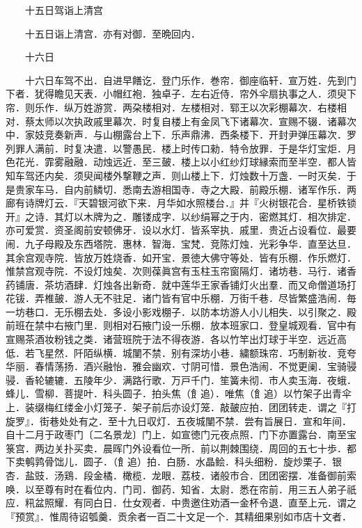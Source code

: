 　　十五日驾诣上清宫

　　十五日诣上清宫．亦有对御．至晩回内．

　　十六日

　　十六日车驾不出．自进早饍讫．登门乐作．巻帘．御座临轩．宣万姓．先到门下者．犹得瞻见天表．小帽红袍．独卓子．左右近侍．帘外伞扇执事之人．须臾下帘．则乐作．纵万姓游赏．两朶楼相对．左楼相对．郓王以次彩棚幕次．右楼相对．蔡太师以次执政戚里幕次．时复自楼上有金凤飞下诸幕次．宣赐不辍．诸幕次中．家妓竞奏新声．与山棚露台上下．乐声鼎沸．西条楼下．开封尹弹压幕次．罗列罪人满前．时复决遣．以警愚民．楼上时传口勑．特令放罪．于是华灯宝炬．月色花光．霏雾融融．动烛远近．至三皷．楼上以小红纱灯球縁索而至半空．都人皆知车驾还内矣．须臾闻楼外撃鞭之声．则山楼上下．灯烛数十万盏．一时灭矣．于是贵家车马．自内前鳞切．悉南去游相国寺．寺之大殿．前殿乐棚．诸军作乐．两廊有诗牌灯云．『天碧银河欲下来．月华如水照楼台．』并『火树银花合．星桥铁锁开』之诗．其灯以木牌为之．雕镂成字．以纱绢幂之于内．密燃其灯．相次排定．亦可爱赏．资圣阁前安顿佛牙．设以水灯．皆系宰执．戚里．贵近占设看位．最要闹．九子母殿及东西塔院．惠林．智海．宝梵．竞陈灯烛．光彩争华．直至达旦．其余宫观寺院．皆放万姓烧香．如开宝．景徳大佛守等处．皆有乐棚．作乐燃灯．惟禁宫观寺院．不设灯烛矣．次则葆眞宫有玉柱玉帘窗隔灯．诸坊巷．马行．诸香药铺唐．茶坊酒肆．灯烛各出新奇．就中莲华王家香铺灯火出羣．而又命僧道场打花钹．弄椎皷．游人无不驻足．诸门皆有官中乐棚．万街千巷．尽皆繁盛浩闹．毎一坊巷口．无乐棚去处．多设小影戏棚子．以防本坊游人小儿相失．以引聚之．殿前班在禁中右掖门里．则相对石掖门设一乐棚．放本班家口．登皇城观看．官中有宣赐茶酒妆粉钱之类．诸营班院于法不得夜游．各以竹竿出灯球于半空．远近高低．若飞星然．阡陌纵横．城闉不禁．别有深坊小巷．繍额珠帘．巧制新妆．竞夸华丽．春情荡扬．酒兴融怡．雅会幽欢．寸阴可惜．景色浩闹．不觉更阑．宝骑骎骎．香轮辘辘．五陵年少．满路行歌．万戸千门．笙簧未彻．市人卖玉海．夜蛾．蜂儿．雪柳．菩提叶．科头圆子．拍头焦（飠追）．唯焦（飠追）以竹架子出青伞上．装缀梅红缕金小灯笼子．架子前后亦设灯笼．敲皷应拍．团团转走．谓之『打旋罗』．街巷处处有之．至十九日収灯．五夜城闉不禁．尝有旨展日．宣和年间．自十二月于政枣门〔二名景龙〕门上．如宣徳门元夜点照．门下亦置露台．南至宝箓宫．两边关扑买卖．晨晖门外设看位一所．前以荆棘围绕．周回的五七十歩．都下卖鹌鹑骨饳儿．圆子．（飠追）拍．白肠．水晶鲙．科头细粉．旋炒栗子．银杏．盐豉．汤鶏．段金橘．橄榄．龙眼．荔枝．诸般市合．团团密摆．准备御前索唤．以至尊有时在看位内．门司．御药．知省．太尉．悉在帘前．用三五人弟子祇应．籸盆照耀．有同白日．仕女观者．中贵邀住劝酒一金杯令退．直至上元．谓之『预赏』．惟周待诏瓠羹．贡余者一百二十文足一个．其精细果别如市店十文者．

